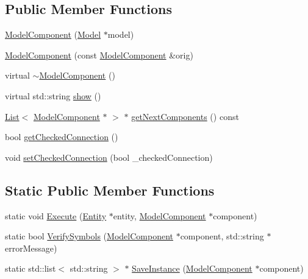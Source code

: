 \subsection*{Public Member Functions}
\begin{DoxyCompactItemize}
\item 
\hyperlink{class_model_component_a1e2b24c3592711a9bd3f131706b7f0c7}{Model\-Component} (\hyperlink{class_model}{Model} $\ast$model)
\item 
\hyperlink{class_model_component_a5b95933e7a265039eb01f6ec88d92675}{Model\-Component} (const \hyperlink{class_model_component}{Model\-Component} \&orig)
\item 
virtual \hyperlink{class_model_component_a6d490d6a2fdf66ad13ed8adcc39ec611}{$\sim$\-Model\-Component} ()
\item 
virtual std\-::string \hyperlink{class_model_component_ad8bc846e36b028eab7efb7da6c549eca}{show} ()
\item 
\hyperlink{class_list}{List}$<$ \hyperlink{class_model_component}{Model\-Component} $\ast$ $>$ $\ast$ \hyperlink{class_model_component_a89fe8e3fb064c68aebbecd36eeed7d43}{get\-Next\-Components} () const 
\item 
bool \hyperlink{class_model_component_a142b21a42547af06ceba81678eeccabc}{get\-Checked\-Connection} ()
\item 
void \hyperlink{class_model_component_af3ae0b0182c8d6291235e0eda0cb79b3}{set\-Checked\-Connection} (bool \-\_\-checked\-Connection)
\end{DoxyCompactItemize}
\subsection*{Static Public Member Functions}
\begin{DoxyCompactItemize}
\item 
static void \hyperlink{class_model_component_a08c5312c2f94f6621577cc1836c2d3e0}{Execute} (\hyperlink{class_entity}{Entity} $\ast$entity, \hyperlink{class_model_component}{Model\-Component} $\ast$component)
\item 
static bool \hyperlink{class_model_component_a0798a220cf903b34ce28c40e136d207d}{Verify\-Symbols} (\hyperlink{class_model_component}{Model\-Component} $\ast$component, std\-::string $\ast$error\-Message)
\item 
static std\-::list$<$ std\-::string $>$ $\ast$ \hyperlink{class_model_component_a45d3805f9b7051b7acc142e5d85cded6}{Save\-Instance} (\hyperlink{class_model_component}{Model\-Component} $\ast$component)
\end{DoxyCompactItemize}

